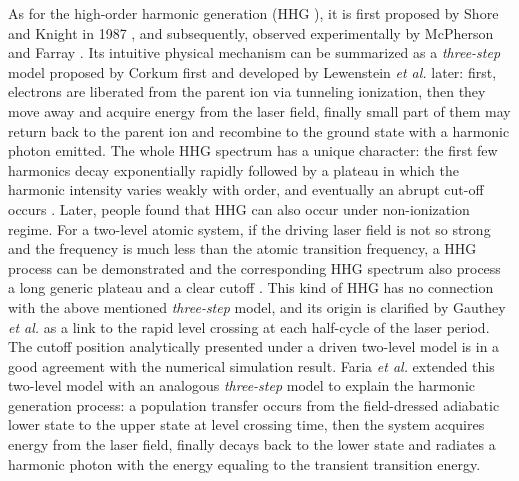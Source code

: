 \documentclass[10pt,letterpaper]{article}
\begin{document}
As for the high-order harmonic generation (HHG ), it is first proposed by Shore and Knight in 1987 \cite{Shore-HHG-Origin-JPB-1987}, and subsequently, observed experimentally by McPherson \cite{McPherson-Early-HHG-JOSAB-1987} and Farray \cite{Ferray-Early-HHG-JPB-1988}. Its intuitive physical mechanism can be summarized as a \emph{three-step} model proposed by Corkum first \cite{Corkum-PRL-1993} and developed by Lewenstein \emph{et al.} later\cite{Lewenstein-SFA-PRA-1994}: first, electrons are liberated from the parent ion via tunneling ionization, then they move away and acquire energy from the laser field, finally small part of them may return back to the parent ion and recombine to the ground state with a harmonic photon emitted. The whole HHG spectrum has a unique character: the first few harmonics decay exponentially rapidly followed by a plateau in which the harmonic intensity varies weakly with order, and eventually an abrupt cut-off occurs \cite{1997Review}. Later, people found that HHG can also occur under non-ionization regime. For a two-level atomic system, if the driving laser field is not so strong and the frequency is much less than the atomic transition frequency, a HHG process can be demonstrated and the corresponding HHG spectrum also process a long generic plateau and a clear cutoff \cite{Sundaram-Early-Two-Level-PRA-1990,Ivanov-Early-Two-Level-PRA-1993,Kaplan-Early-Two-Level-PRA-1994,Gauthey-Early-Two-Level-PRA-1997}. This kind of HHG has no connection with the above mentioned \emph{three-step} model, and its origin is clarified by Gauthey \emph{et al.} \cite{Gauthey-Early-Two-Level-PRA-1997} as a link to the rapid level crossing at each half-cycle of the laser period. The cutoff position analytically presented under a driven two-level model is in a good agreement with the numerical simulation result. Faria \emph{et al.} \cite{Faria-Two-Level-Three-Step-PRA-2002} extended this two-level model with an analogous \emph{three-step} model to explain the harmonic generation process: a population transfer occurs from the field-dressed adiabatic lower state to the upper state at level crossing time, then the system acquires energy from the laser field, finally decays back to the lower state and radiates a harmonic photon with the energy equaling to the transient transition energy.
\end{document}

